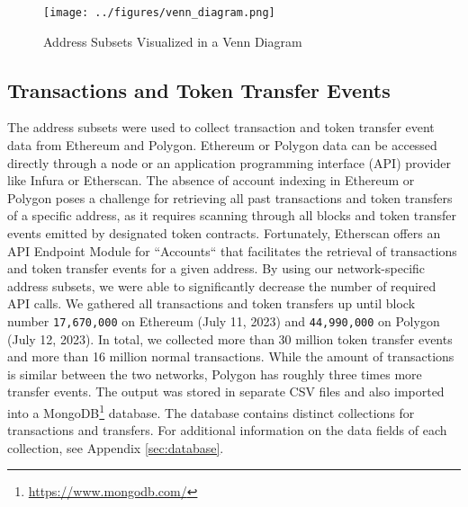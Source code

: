 \documentclass[12pt,a4paper,titlepage,oneside,english]{article}
\begin{document}
\begin{figure}[h!]
	\centering
	\texttt{[image: ../figures/venn\_diagram.png]}
	\caption{Address Subsets Visualized in a Venn Diagram}
	\label{fig:Venn}
\end{figure} 

\subsection{Transactions and Token Transfer Events}
The address subsets were used to collect transaction and token transfer event data from Ethereum and Polygon. Ethereum or Polygon data can be accessed directly through a node or an application programming interface (API) provider like Infura or Etherscan. The absence of account indexing in Ethereum or Polygon poses a challenge for retrieving all past transactions and token transfers of a specific address, as it requires scanning through all blocks and token transfer events emitted by designated token contracts. Fortunately, Etherscan offers an API Endpoint Module for ``Accounts`` that facilitates the retrieval of transactions and token transfer events for a given address. By using our network-specific address subsets, we were able to significantly decrease the number of required API calls. 
We gathered all transactions and token transfers up until block number \texttt{17,670,000} on Ethereum (July 11, 2023) and \texttt{44,990,000} on Polygon (July 12, 2023). In total, we collected more than 30 million %
token transfer events and more than 16 million %
 normal transactions. While the amount of transactions is similar between the two networks, Polygon has roughly three times more transfer events. \newline The output was stored in separate CSV files and also imported into a MongoDB\footnote{\url{https://www.mongodb.com/}} database. The database contains distinct collections for transactions and transfers. For additional information on the data fields of each collection, see Appendix \ref{sec:database}. 

\iffalse
Transfer Events: 30,689,978
Transfer Events Ethereum: 7,832,778
Transfer Events Polygon: 22,857,200

Transactions = 16,092,531
Transactions Ethereum = 8,448,584
Transactions Polygon = 7,643,947

Figure X visualizes the number of daily transactions and token transfers for each chain.
\begin{figure}[h!]
	\centering
	\texttt{[image: ../figures/transfers\_tx\_by\_chain.png]}
	\caption{Monthly Transactions and Token Transfers by chain}
	\label{fig:Data}
\end{figure} 
Transfer Events, adding Information (isInSet) \\
Transactions \\
Filtering, Intra-set transfers\\
Data Structure, Fields \\
\fi
\end{document}
